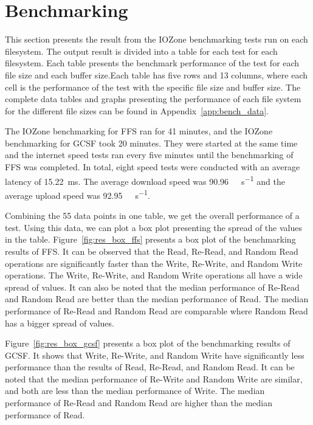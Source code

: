 \section{Benchmarking}
\label{sec:res_bench}
This section presents the result from the IOZone benchmarking tests run on each filesystem. The output result is divided into a table for each test for each filesystem. Each table presents the benchmark performance of the test for each file size and each buffer size.Each table has five rows and 13 columns, where each cell is the performance of the test with the specific file size and buffer size. The complete data tables and graphs presenting the performance of each file system for the different file sizes can be found in Appendix~\ref{app:bench_data}.

The IOZone benchmarking for \gls{FFS} ran for 41 minutes, and the IOZone benchmarking for \gls{GCSF} took 20 minutes. They were started at the same time and the internet speed tests ran every five minutes until the benchmarking of \gls{FFS} was completed. In total, eight speed tests were conducted with an average latency of \SI{15.22}{\milli\second}. The average download speed was \SI[per-mode = symbol]{90.96}{\mega\bit\per\second} and the average upload speed was \SI[per-mode = symbol]{92.95}{\mega\bit\per\second}.

Combining the 55 data points in one table, we get the overall performance of a test. Using this data, we can plot a box plot presenting the spread of the values in the table. Figure~\ref{fig:res_box_ffs} presents a box plot of the benchmarking results of \gls{FFS}. It can be observed that the Read, \mbox{Re-Read}, and Random Read operations are significantly faster than the Write, \mbox{Re-Write}, and Random Write operations. The Write, \mbox{Re-Write}, and Random Write operations all have a wide spread of values. It can also be noted that the median performance of \mbox{Re-Read} and Random Read are better than the median performance of Read. The median performance of \mbox{Re-Read} and Random Read are comparable where Random Read has a bigger spread of values.

Figure~\ref{fig:res_box_gcsf} presents a box plot of the benchmarking results of \gls{GCSF}. It shows that Write, \mbox{Re-Write}, and Random Write have significantly less performance than the results of Read, \mbox{Re-Read}, and Random Read. It can be noted that the median performance of \mbox{Re-Write} and Random Write are similar, and both are less than the median performance of Write. The median performance of \mbox{Re-Read} and Random Read are higher than the median performance of Read.

